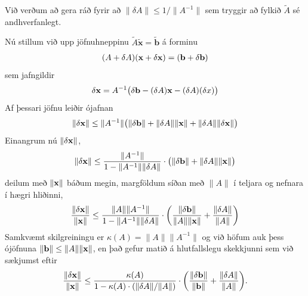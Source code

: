 \documentclass[letterpaper,10pt,icelandic]{sphinxmanual}
\begin{document}
Við verðum að gera ráð fyrir að \(\|\delta A\|\leq 1/\|A^{-1}\|\)
sem tryggir að fylkið \(\tilde A\) sé andhverfanlegt.

Nú stillum við upp jöfnuhneppinu
\(\tilde A\mathbf{\tilde x}=\mathbf{\tilde  b}\) á forminu
\begin{gather}
\begin{split}(A+\delta A)(\mbox{${\bf x}$}+\delta \mbox{${\bf x}$})=(\mbox{${\bf b}$}+\delta\mbox{${\bf b}$})\end{split}\notag
\end{gather}
sem jafngildir
\begin{gather}
\begin{split}\delta\mbox{${\bf x}$}=A^{-1}\big(\delta\mbox{${\bf b}$}-(\delta A)\mbox{${\bf x}$}-(\delta A)(\delta x)\big)\end{split}\notag
\end{gather}
Af þessari jöfnu leiðir ójafnan
\begin{gather}
\begin{split}\|\delta\mbox{${\bf x}$}\|\leq
\|A^{-1}\|\big(\|\delta\mbox{${\bf b}$}\|+\|\delta A\|\|\mbox{${\bf x}$}\|+\|\delta A\|\|\delta \mbox{${\bf x}$}\|\big)\end{split}\notag
\end{gather}
Einangrum nú \(\|\delta \mbox{${\bf x}$}\|\),
\begin{gather}
\begin{split}\|\delta\mbox{${\bf x}$}\|\leq
\dfrac{\|A^{-1}\|}{1-\|A^{-1}\|\|\delta A\|}\cdot
\big(\|\delta\mbox{${\bf b}$}\|+\|\delta A\|\|\mbox{${\bf x}$}\|\big)\end{split}\notag
\end{gather}
deilum með \(\|\mbox{${\bf x}$}\|\) báðum megin, margföldum síðan
með \(\|A\|\) í teljara og nefnara í hægri hliðinni,
\begin{gather}
\begin{split}\dfrac{\|\delta\mbox{${\bf x}$}\|} {\|\mbox{${\bf x}$}\|}\leq
\dfrac{\|A\|\|A^{-1}\|}{1-\|A^{-1}\|\|\delta A\|}\cdot
\bigg(\dfrac{\|\delta\mbox{${\bf b}$}\|}{\|A\|\|\mbox{${\bf x}$}\|}+
\dfrac{\|\delta A\|}{\|A\|}\bigg)\end{split}\notag
\end{gather}
Samkvæmt skilgreiningu er \(\kappa(A)=\|A\|\|A^{-1}\|\) og við höfum
auk þess ójöfnuna
\(\|\mbox{${\bf b}$}\|\leq \|A\|\|\mbox{${\bf x}$}\|\), en það gefur
matið á hlutfallslegu skekkjunni sem við sækjumst eftir
\begin{gather}
\begin{split}\dfrac{\|\delta\mbox{${\bf x}$}\|} {\|\mbox{${\bf x}$}\|}\leq
\dfrac{\kappa(A)}{1-\kappa(A)\cdot(\|\delta A\|/\|A\|)}\cdot
\bigg(\dfrac{\|\delta\mbox{${\bf b}$}\|}{\|\mbox{${\bf b}$}\|}+
\dfrac{\|\delta A\|}{\|A\|}\bigg).\end{split}\notag
\end{gather}
\end{document}
